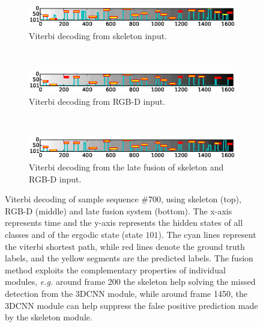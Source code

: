 \begin{figure}[t]
        \centering
        \begin{subfigure}[c]{.8\textwidth}
                \includegraphics[width=\textwidth]{images/path/Sample0700_sk}
                \caption{Viterbi decoding from skeleton input.}
                \label{Sample0700_sk}
        \end{subfigure}%
        ~ %

        \begin{subfigure}[c]{0.8\textwidth}
                \includegraphics[width=\textwidth]{images/path/Sample0700_cnn}
                \caption{Viterbi decoding from RGB-D input.}
                \label{Sample0700_cnn}
        \end{subfigure}

        ~ %
        \begin{subfigure}[c]{0.8\textwidth}
                \includegraphics[width=\textwidth]{images/path/Sample0700_combined}
                \caption{Viterbi decoding from the late fusion of skeleton and RGB-D input.}
                \label{Sample0700_combined}
        \end{subfigure}
\vspace*{-3mm}
  \caption{Viterbi decoding of sample sequence \#700, using skeleton (top), RGB-D (middle) and late fusion system (bottom).
The x-axis represents time and the y-axis represents the hidden states of all classes and of the ergodic state (state $101$).
The cyan lines represent the viterbi shortest path, while red lines denote the ground truth labels,
and the yellow segments  are the predicted labels.
The fusion method exploits the complementary properties of individual modules, \emph{e.g.} around frame 200 the skeleton
help solving  the missed detection from the 3DCNN module,
while around frame 1450, the 3DCNN module can help suppress the false positive prediction made by the skeleton module.
}
\label{fig:Sample0700_comparison}
\end{figure}

